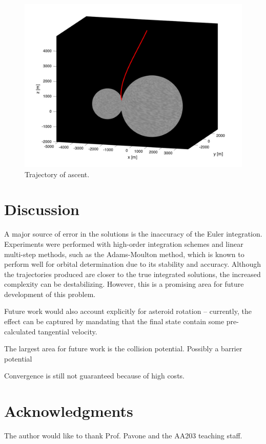 \documentclass{article}
\begin{document}
\begin{multicols}{2}
\begin{figure}[H]
	\center
	\includegraphics[width=0.85\linewidth]{figs/asc_traj_good}
	\caption{Trajectory of ascent.}
	\label{fig:asc_traj}
\end{figure}

\section*{Discussion}
A major source of error in the solutions is the inaccuracy of the Euler integration. Experiments were performed with high-order integration schemes and linear multi-step methods, such as the Adams-Moulton method, which is known to perform well for orbital determination due to its stability and accuracy. Although the trajectories produced are closer to the true integrated solutions, the increased complexity can be destabilizing. However, this is a promising area for future development of this problem. 

Future work would also account explicitly for asteroid rotation -- currently, the effect can be captured by mandating that the final state contain some pre-calculated tangential velocity.

The largest area for future work is the collision potential. Possibly a barrier potential

Convergence is still not guaranteed because of high costs.

\section*{Acknowledgments}
The author would like to thank Prof. Pavone and the AA203 teaching staff.

\end{multicols}
\end{document}
